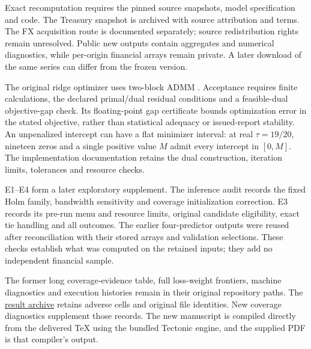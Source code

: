 Exact recomputation requires the pinned source snapshots, model specification and code. The Treasury snapshot is archived with source attribution and terms. The FX acquisition route is documented separately; source redistribution rights remain unresolved. Public new outputs contain aggregates and numerical diagnostics, while per-origin financial arrays remain private. A later download of the same series can differ from the frozen version.

The original ridge optimizer uses two-block ADMM \citep{boyd2011}. Acceptance requires finite calculations, the declared primal/dual residual conditions and a feasible-dual objective-gap check. Its floating-point gap certificate bounds optimization error in the stated objective, rather than statistical adequacy or issued-report stability. An unpenalized intercept can have a flat minimizer interval: at real $\tau=19/20$, nineteen zeros and a single positive value $M$ admit every intercept in $[0,M]$. The implementation documentation retains the dual construction, iteration limits, tolerances and resource checks.

E1--E4 form a later exploratory supplement. The inference audit records the fixed Holm family, bandwidth sensitivity and coverage initialization correction. E3 records its pre-run menu and resource limits, original candidate eligibility, exact tie handling and all outcomes. The earlier four-predictor outputs were reused after reconciliation with their stored arrays and validation selections. These checks establish what was computed on the retained inputs; they add no independent financial sample.

The former long coverage-evidence table, full loss-weight frontiers, machine diagnostics and execution histories remain in their original repository paths. The \href{https://github.com/ByronLi0207/financial-mathematics-paper-20261020/tree/main/results}{result archive} retains adverse cells and original file identities. New coverage diagnostics supplement those records. The new manuscript is compiled directly from the delivered TeX using the bundled Tectonic engine, and the supplied PDF is that compiler's output.

